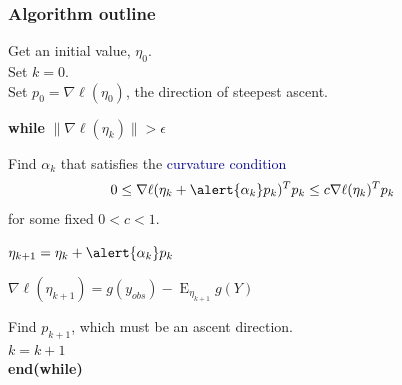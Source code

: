 \documentclass[ 10pt]{beamer}
\DeclareMathOperator{\E}{E}
\begin{document}
\frame
{
\frametitle{Algorithm outline}
\small

Get an initial value, $\eta_0$.\\ 
Set $k=0$. \\
Set $p_0 = \nabla \ell( \eta_0)$, the direction of steepest ascent. \\
\vspace*{2mm}

\textbf{while}  $\lVert \nabla \ell( \eta_k) \rVert > \epsilon$ \\ 
\vspace*{1mm}

\hspace*{4mm} Find \alert{$\alpha_k$} that satisfies the 
\textcolor{darkblue}{curvature condition}
\begin{align*}
	 0 & \leq \nabla \ell( \eta_k + \alert{\alpha_k} p_k)^T p_k \leq c \nabla \ell(\eta_k)^T p_k
\end{align*}
\hspace*{4mm} \indent for some fixed $0 < c < 1$.  
\vspace*{1mm}

\hspace*{4mm} $\eta_{k+1} = \eta_k + \alert{\alpha_k} p_k$\\
\vspace*{1mm}

\hspace*{4mm} $\nabla \ell( \eta_{k+1}) = g( y _{obs}) - \E_{\eta_{k+1}}g(Y)$\\
\vspace*{1mm}
 

\hspace*{4mm} \indent Find \alert{$p_{k+1}$}, which must be an ascent direction. \\


\hspace*{4mm} \indent $k = k + 1$  \\

\textbf{end(while)}
}


%
%
\end{document}
